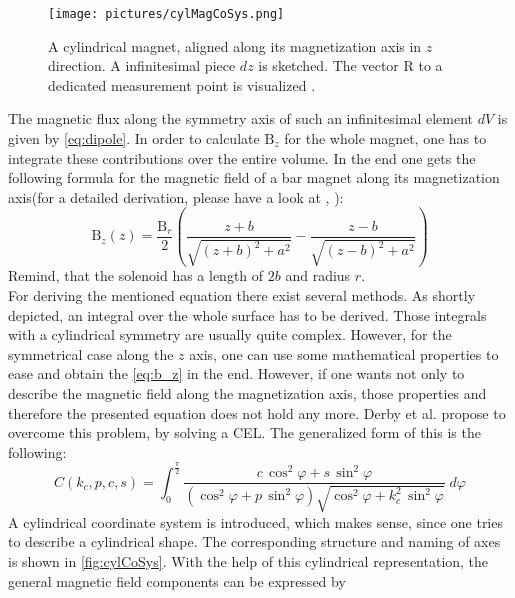 \begin{figure}[!htb]
\centering
\texttt{[image: pictures/cylMagCoSys.png]}
\caption[Cylindrical bar magnet with infinitesimal slice $ dz $]
{A cylindrical magnet, aligned along its magnetization axis in $ z $ direction. A infinitesimal piece $ dz $ is sketched. The vector R to a dedicated measurement point is visualized \cite{derby2010cylindrical}.}
\label{fig:cylMag}
\end{figure}
The magnetic flux along the symmetry axis of such an infinitesimal element $ dV $ is given by \ref{eq:dipole}. In order to calculate $ \mathrm{B}_{z} $ for the whole magnet, one has to integrate these contributions over the entire volume. In the end one gets the following formula for the magnetic field of a bar magnet along its magnetization axis(for a detailed derivation, please have a look at \cite{camacho2013alternative}, \cite{derby2010cylindrical}):
\begin{equation} \label{eq:b_z}
\mathrm{B}_{z}(z) = \frac{\mathrm{B}_r}{2} \left ( \frac{z + b}{\sqrt{(z + b)^2 + a^2}} - \frac{z - b}{\sqrt{(z - b)^2 + a^2}} \right)
\end{equation}
Remind, that the solenoid has a length of $ 2b $ and radius $ r $.\\
For deriving the mentioned equation there exist several methods. As shortly depicted, an integral over the whole surface has to be derived. Those integrals with a cylindrical symmetry are usually quite complex. However, for the symmetrical case along the $ z $ axis, one can use some mathematical properties to ease and obtain the \ref{eq:b_z} in the end. However, if one wants not only to describe the magnetic field along the magnetization axis, those properties and therefore the presented equation does not hold any more. Derby et al. \cite{derby2010cylindrical} propose to overcome this problem, by solving a \ac{CEL}. The generalized form of this is the following:
\begin{equation}\label{eq:cel}
C(k_{c},p,c,s) = \int_{0}^{\frac{\pi}{2}} \frac{c \, \cos^{2}\varphi + s \, \sin^{2}\varphi}
{(\cos^{2}\varphi + p \, \sin^{2}\varphi)\sqrt{\cos^{2}\varphi + k_{c}^{2} \, \sin^{2}\varphi}} \; d\varphi
\end{equation}
A cylindrical coordinate system is introduced, which makes sense, since one tries to describe a cylindrical shape. The corresponding structure and naming of axes is shown in \ref{fig:cylCoSys}. With the help of this cylindrical representation, the general magnetic field components can be expressed by

